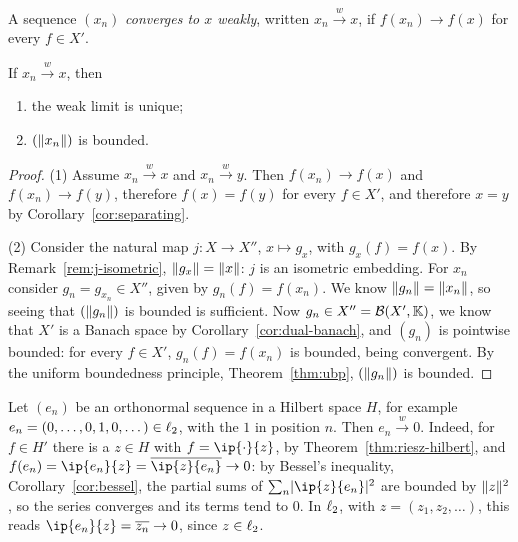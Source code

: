\begin{definition}\label{def:weak}
A sequence $(x_n)$ \emph{converges to $x$ weakly}, written
$x_n \xrightarrow{w} x$, if $f(x_n) \to f(x)$ for every $f \in X'$.
\end{definition}

\begin{proposition}\label{prop:weak-limit}
If $x_n \xrightarrow{w} x$, then
\begin{enumerate}
  \item the weak limit is unique;
  \item $(\lVert x_n\rVert)$ is bounded.
\end{enumerate}
\end{proposition}

\begin{proof}
(1) Assume $x_n \xrightarrow{w} x$ and $x_n \xrightarrow{w} y$. Then
$f(x_n) \to f(x)$ and $f(x_n) \to f(y)$, therefore $f(x) = f(y)$ for every
$f \in X'$, and therefore $x = y$ by Corollary~\ref{cor:separating}.

(2) Consider the natural map $j \colon X \to X''$, $x \mapsto g_x$, with
$g_x(f) = f(x)$. By Remark~\ref{rem:j-isometric}, $\lVert g_x\rVert = \lVert x\rVert$:
$j$ is an isometric embedding. For $x_n$ consider $g_n = g_{x_n} \in X''$,
given by $g_n(f) = f(x_n)$. We know $\lVert g_n\rVert = \lVert x_n\rVert$, so seeing that
$(\lVert g_n\rVert)$ is bounded is sufficient. Now $g_n \in X'' = \mathcal{B}(X', \mathbb{K})$, we
know that $X'$ is a Banach space by Corollary~\ref{cor:dual-banach}, and
$(g_n)$ is pointwise bounded: for every $f \in X'$, $g_n(f) = f(x_n)$ is
bounded, being convergent. By the uniform boundedness principle,
Theorem~\ref{thm:ubp}, $(\lVert g_n\rVert)$ is bounded.
\end{proof}

\begin{example}\label{ex:ons-weak}
Let $(e_n)$ be an orthonormal sequence in a Hilbert space $H$, for example
$e_n = (0, \dots, 0, 1, 0, \dots) \in \ell_{2}$, with the $1$ in position $n$.
Then $e_n \xrightarrow{w} 0$. Indeed, for $f \in H'$ there is a $z \in H$
with $f = \ip{\cdot}{z}$, by Theorem~\ref{thm:riesz-hilbert}, and
$f(e_n) = \ip{e_n}{z} = \overline{\ip{z}{e_n}} \to 0$: by Bessel's
inequality, Corollary~\ref{cor:bessel}, the partial sums of
$\sum_n \abs{\ip{z}{e_n}}^2$ are bounded by $\lVert z\rVert^2$, so the series
converges and its terms tend to $0$. In $\ell_{2}$, with
$z = (z_1, z_2, \dots)$, this reads $\ip{e_n}{z} = \overline{z_n} \to 0$,
since $z \in \ell_{2}$.
\end{example}


